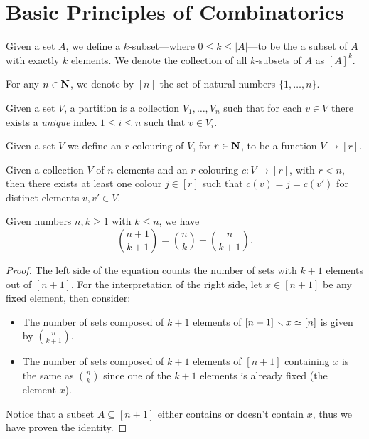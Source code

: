\section{Basic Principles of Combinatorics}

\begin{notation}[\(k\)-subsets]
Given a set \(A\), we define a \(k\)-subset---where \(0 \leq k \leq |A|\)---to
be the a subset of \(A\) with exactly \(k\) elements. We denote the collection
of all \(k\)-subsets of \(A\) as \([A]^k\).
\end{notation}

\begin{notation}[Range]
For any \(n \in \mathbf{N}\), we denote by \([n]\) the set of natural numbers
\(\{1, \dots, n\}\).
\end{notation}

\begin{definition}[Partition]
Given a set \(V\), a partition is a collection \(V_1, \dots, V_n\) such
that for each \(v \in V\) there exists a \emph{unique} index \(1 \leq i
\leq n\) such that \(v \in V_i\).
\end{definition}

\begin{definition}[Colouring]
    Given a set \(V\) we define an \(r\)-colouring of \(V\), for \(r \in \mathbf{N}\),
    to be a function \(V \to [r]\).
\end{definition}

\begin{axiom}
    Given a collection \(V\) of \(n\) elements and an \(r\)-colouring \(c: V
    \to [r]\), with \(r < n\), then there exists at least one colour \(j \in
    [r]\) such that \(c(v) = j = c(v')\) for distinct elements \(v, v' \in V\).
\end{axiom}

\begin{lemma}
    Given numbers \(n, k \geq 1\) with \(k \leq n\), we have
    \[
        \binom{n + 1}{k+1} = \binom n k + \binom n {k + 1}.
    \]
\end{lemma}

\begin{proof}
    The left side of the equation counts the number of sets with \(k+1\)
    elements out of \([n+1]\). For the interpretation of the right side, let
    \(x \in [n + 1]\) be any fixed element, then consider:
    \begin{itemize}\setlength\itemsep{0em}
        \item The number of sets composed of \(k+1\) elements of \([n+1]
          \smallsetminus x \simeq [n]\) is given by
          \(\binom n {k+1}\).
        \item The number of sets composed of \(k+1\) elements of \([n+1]\)
          containing \(x\) is the same as \(\binom n k\) since one of the
          \(k+1\) elements is already fixed (the element \(x\)).
    \end{itemize}
    Notice that a subset \(A \subseteq [n + 1]\) either contains or doesn't
    contain \(x\), thus we have proven the identity.
\end{proof}

